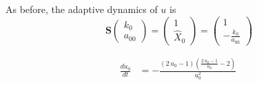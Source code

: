\documentclass{article}
\begin{document}
As before, the adaptive dynamics of $u$ is
\[
  \mathbf S \left(\begin{array}{c}
  k_{0}\\
  a_{00}
\end{array}\right) = \left(\begin{array}{c}
  1\\
  \hat{X}_{0}
\end{array}\right) = \left(\begin{array}{c}
  1\\
  -\frac{k_{0}}{a_{00}}
\end{array}\right)
\]

\[\begin{align*}
\frac{du_{0}}{dt} &= -\frac{{\left(2 \, u_{0} - 1\right)} {\left(\frac{2 \, u_{0} - 1}{u_{0}} - 2\right)}}{u_{0}^{2}}
\end{align*} \
\]
\end{document}
